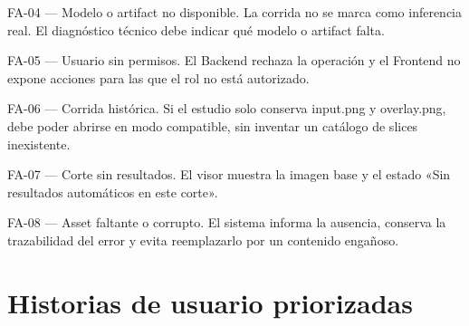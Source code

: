 FA-04 — Modelo o artifact no disponible. La corrida no se marca como inferencia real. El diagnóstico técnico debe indicar qué modelo o artifact falta.

FA-05 — Usuario sin permisos. El Backend rechaza la operación y el Frontend no expone acciones para las que el rol no está autorizado.

FA-06 — Corrida histórica. Si el estudio solo conserva input.png y overlay.png, debe poder abrirse en modo compatible, sin inventar un catálogo de slices inexistente.

FA-07 — Corte sin resultados. El visor muestra la imagen base y el estado «Sin resultados automáticos en este corte».

FA-08 — Asset faltante o corrupto. El sistema informa la ausencia, conserva la trazabilidad del error y evita reemplazarlo por un contenido engañoso.

\section{Historias de usuario priorizadas}

